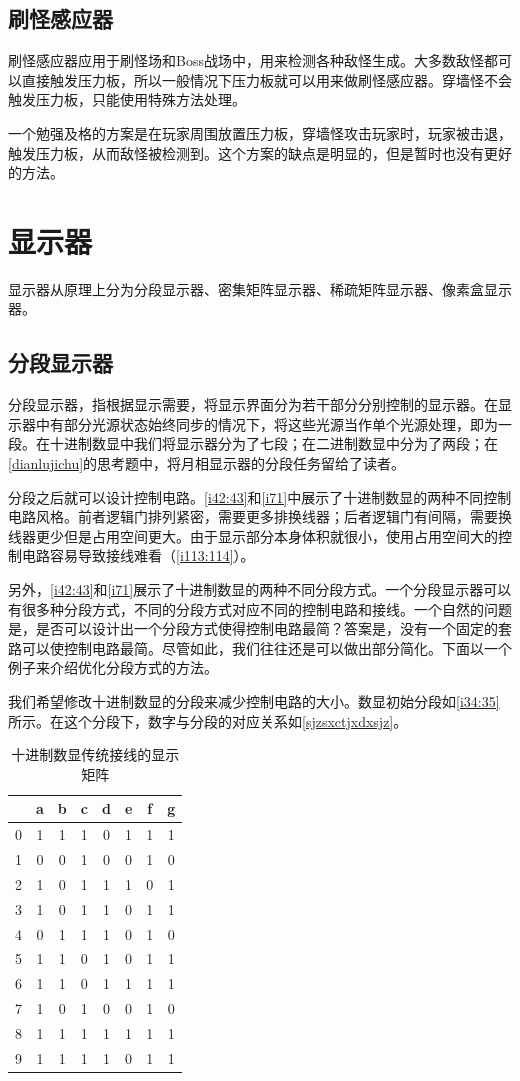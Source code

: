 \subsection{刷怪感应器}
刷怪感应器应用于刷怪场和Boss战场中，用来检测各种敌怪生成。大多数敌怪都可以直接触发压力板，所以一般情况下压力板就可以用来做刷怪感应器。穿墙怪不会触发压力板，只能使用特殊方法处理。

一个勉强及格的方案是在玩家周围放置压力板，穿墙怪攻击玩家时，玩家被击退，触发压力板，从而敌怪被检测到。这个方案的缺点是明显的，但是暂时也没有更好的方法。

\section{显示器}
显示器从原理上分为分段显示器、密集矩阵显示器、稀疏矩阵显示器、像素盒显示器。

\subsection{分段显示器}
分段显示器，指根据显示需要，将显示界面分为若干部分分别控制的显示器。在显示器中有部分光源状态始终同步的情况下，将这些光源当作单个光源处理，即为一段。在十进制数显中我们将显示器分为了七段；在二进制数显中分为了两段；在\autoref{dianlujichu}的思考题中，将月相显示器的分段任务留给了读者。

分段之后就可以设计控制电路。\autoref{i42:43}和\autoref{i71}中展示了十进制数显的两种不同控制电路风格。前者逻辑门排列紧密，需要更多排换线器；后者逻辑门有间隔，需要换线器更少但是占用空间更大。由于显示部分本身体积就很小，使用占用空间大的控制电路容易导致接线难看（\autoref{i113:114}）。

另外，\autoref{i42:43}和\autoref{i71}展示了十进制数显的两种不同分段方式。一个分段显示器可以有很多种分段方式，不同的分段方式对应不同的控制电路和接线。一个自然的问题是，是否可以设计出一个分段方式使得控制电路最简？答案是，没有一个固定的套路可以使控制电路最简。尽管如此，我们往往还是可以做出部分简化。下面以一个例子来介绍优化分段方式的方法。

我们希望修改十进制数显的分段来减少控制电路的大小。数显初始分段如\autoref{i34:35}所示。在这个分段下，数字与分段的对应关系如\autoref{sjzsxctjxdxsjz}。

\begin{table}[!ht]
\centering
\begin{tabular}{c|ccccccc}
&a&b&c&d&e&f&g\\\hline
0&1&1&1&0&1&1&1\\
1&0&0&1&0&0&1&0\\
2&1&0&1&1&1&0&1\\
3&1&0&1&1&0&1&1\\
4&0&1&1&1&0&1&0\\
5&1&1&0&1&0&1&1\\
6&1&1&0&1&1&1&1\\
7&1&0&1&0&0&1&0\\
8&1&1&1&1&1&1&1\\
9&1&1&1&1&0&1&1
\end{tabular}
\caption{十进制数显传统接线的显示矩阵}\label{sjzsxctjxdxsjz}
\end{table}

